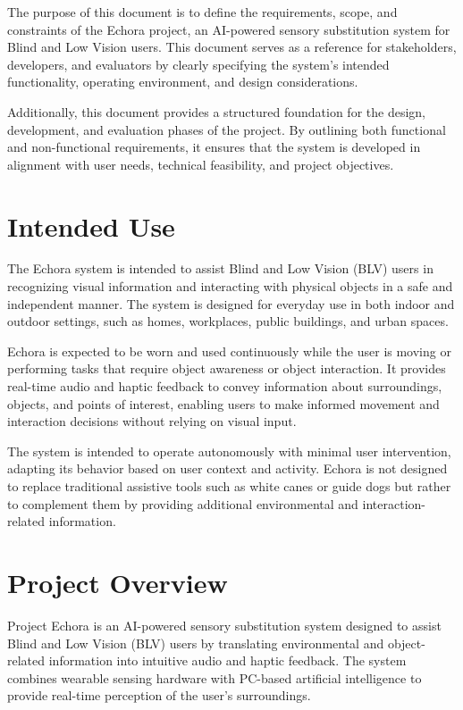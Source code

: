 The purpose of this document is to define the requirements, scope, and constraints of the Echora project, an AI-powered sensory substitution system for Blind and Low Vision users. This document serves as a reference for stakeholders, developers, and evaluators by clearly specifying the system’s intended functionality, operating environment, and design considerations.

Additionally, this document provides a structured foundation for the design, development, and evaluation phases of the project. By outlining both functional and non-functional requirements, it ensures that the system is developed in alignment with user needs, technical feasibility, and project objectives.

\section{Intended Use}

The Echora system is intended to assist Blind and Low Vision (BLV) users in recognizing visual information and interacting with physical objects in a safe and independent manner. The system is designed for everyday use in both indoor and outdoor settings, such as homes, workplaces, public buildings, and urban spaces.

Echora is expected to be worn and used continuously while the user is moving or performing tasks that require object awareness or object interaction. It provides real-time audio and haptic feedback to convey information about surroundings, objects, and points of interest, enabling users to make informed movement and interaction decisions without relying on visual input.

The system is intended to operate autonomously with minimal user intervention, adapting its behavior based on user context and activity. Echora is not designed to replace traditional assistive tools such as white canes or guide dogs but rather to complement them by providing additional environmental and interaction-related information.

\section{Project Overview}

Project Echora is an AI-powered sensory substitution system designed to assist Blind and Low Vision (BLV) users by translating environmental and object-related information into intuitive audio and haptic feedback. The system combines wearable sensing hardware with PC-based artificial intelligence to provide real-time perception of the user’s surroundings.

